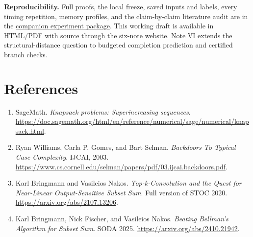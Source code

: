 \documentclass[10pt,english]{article}
\begin{document}
\vspace{.3em}
\noindent\textbf{Reproducibility.} Full proofs, the local freeze, saved inputs and labels, every timing repetition, memory profiles, and the claim-by-claim literature audit are in the \href{https://github.com/jonland82/exponential-search-spaces/tree/master/Structural_Distance_Subset_Sum}{companion experiment package}. This working draft is available in HTML/PDF with source through the six-note website. Note VI extends the structural-distance question to budgeted completion prediction and certified branch checks.

\section{References}
\small
\begin{enumerate}
\item SageMath. \emph{Knapsack problems: Superincreasing sequences}. \url{https://doc.sagemath.org/html/en/reference/numerical/sage/numerical/knapsack.html}.
\item Ryan Williams, Carla P. Gomes, and Bart Selman. \emph{Backdoors To Typical Case Complexity}. IJCAI, 2003. \url{https://www.cs.cornell.edu/selman/papers/pdf/03.ijcai.backdoors.pdf}.
\item Karl Bringmann and Vasileios Nakos. \emph{Top-k-Convolution and the Quest for Near-Linear Output-Sensitive Subset Sum}. Full version of STOC 2020. \url{https://arxiv.org/abs/2107.13206}.
\item Karl Bringmann, Nick Fischer, and Vasileios Nakos. \emph{Beating Bellman's Algorithm for Subset Sum}. SODA 2025. \url{https://arxiv.org/abs/2410.21942}.
\end{enumerate}
\end{document}
